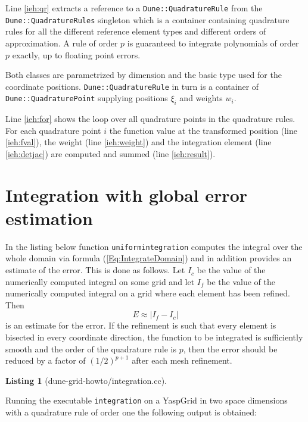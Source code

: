\documentclass[11pt,a4paper,headinclude,footinclude,DIV16,headings=normal]{scrreprt}
\newtheorem{lst}{Listing}
\begin{document}
Line \ref{ieh:qr} extracts a reference to a
\lstinline!Dune::QuadratureRule!  from the
\lstinline!Dune::QuadratureRules! singleton which is a container
containing quadrature rules for all the different reference element
types and different orders of approximation. A rule of order $p$ is
guaranteed to integrate polynomials of order $p$ exactly, up to
floating point errors.

Both classes are
parametrized by dimension and the basic type used for the coordinate
positions. \lstinline!Dune::QuadratureRule! in turn is a container of
\lstinline!Dune::QuadraturePoint! supplying positions $\xi_i$ and
weights $w_i$.

Line \ref{ieh:for} shows the loop over all quadrature points in the
quadrature rules. For each quadrature point $i$ the function value at
the transformed position (line \ref{ieh:fval}), the weight (line
\ref{ieh:weight}) and the integration element (line \ref{ieh:detjac})
are computed and summed (line \ref{ieh:result}).

\section{Integration with global error estimation}

In the listing below function \lstinline!uniformintegration!
computes the integral over the whole domain via formula
(\ref{Eq:IntegrateDomain}) and in addition provides an estimate of the
error. This is done as follows. Let $I_c$ be the value of the numerically
computed integral on some grid and let $I_f$ be the value of the
numerically computed integral on a grid where each element has been
refined. Then
\begin{equation}
\label{Eq:GlobalError}
E \approx |I_f-I_c|
\end{equation}
is an estimate for the error. If
the refinement is such that every element is bisected in every
coordinate direction, the function to be integrated is sufficiently
smooth and the order of the quadrature rule is $p$,
then the error should be reduced by a factor of $(1/2)^{p+1}$ after
each mesh refinement.

\begin{lst}[dune-grid-howto/integration.cc] \mbox{}


\end{lst}

Running the executable \lstinline!integration! on a YaspGrid in two
space dimensions with a quadrature rule of order
one the following output is obtained:
\end{document}
